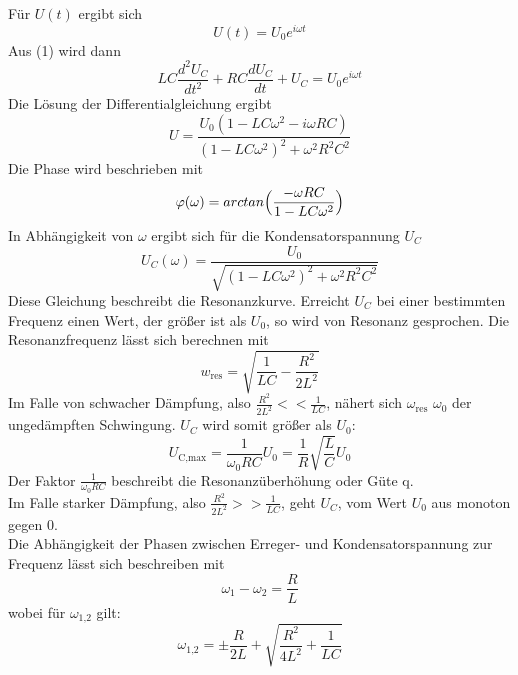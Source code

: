 Für $U(t)$ ergibt sich
\begin{equation}
	U(t) = U_0 e^{i\omega t}
\end{equation}
Aus (1) wird dann 
\begin{equation}
	LC\frac{d^2U_C}{dt^2} + RC\frac{dU_C}{dt} + U_C = U_0e^{i\omega t}
\end{equation}
Die Lösung der Differentialgleichung ergibt
\begin{equation}
	U = \frac{U_0(1-LC\omega^2-i\omega RC)}{(1-LC\omega^2)^2+\omega^2R^2C^2}
\end{equation}
Die Phase wird beschrieben mit
\begin{equation}
	\varphi(\omega) = arctan\Bigl(\frac{-\omega RC}{1-LC\omega^2}\Bigr)
\end{equation}
In Abhängigkeit von $\omega$ ergibt sich für die Kondensatorspannung $U_C$
\begin{equation}
	U_C(\omega)=\frac{U_0}{\sqrt{(1-LC\omega^2)^2+\omega^2R^2C^2}}
\end{equation}
Diese  Gleichung beschreibt die Resonanzkurve. 
Erreicht $U_C$ bei einer bestimmten Frequenz einen Wert, der größer ist als $U_0$, so wird von Resonanz gesprochen.
Die Resonanzfrequenz lässt sich berechnen mit
\begin{equation}
	w_{\text{res}}=\sqrt{\frac{1}{LC}-\frac{R^2}{2L^2}}
\end{equation}
Im Falle von schwacher Dämpfung, also $\frac{R^2}{2L^2}<<\frac{1}{LC}$, nähert sich $\omega_\text{res}$ $\omega_0$ der ungedämpften Schwingung. $U_C$ wird somit größer als $U_0$:
\begin{equation}
	U_\text{C,max}=\frac{1}{\omega_0RC}U_0=\frac{1}{R}\sqrt{\frac{L}{C}}U_0
\end{equation}
Der Faktor $\frac{1}{\omega_0RC}$ beschreibt die Resonanzüberhöhung oder Güte q.
\\
Im Falle starker Dämpfung, also $\frac{R^2}{2L^2} >> \frac{1}{LC}$, geht $U_C$, vom Wert $U_0$ aus monoton gegen 0.
\\
Die Abhängigkeit der Phasen zwischen Erreger- und Kondensatorspannung zur Frequenz lässt sich beschreiben mit
\begin{equation}
	\omega_1 - \omega_2 = \frac{R}{L}
\end{equation}
wobei für $\omega_\text{1,2}$ gilt:
\begin{equation}
	\omega_\text{1,2}=\pm \frac{R}{2L} + \sqrt{\frac{R^2}{4L^2}+\frac{1}{LC}}
\end{equation}
\newpage